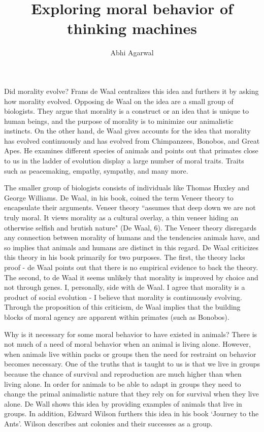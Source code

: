 \documentclass[11pt, oneside]{article}
\title{Exploring moral behavior of thinking machines}
\author{Abhi Agarwal}
\date{}
\begin{document}
\maketitle

\par Did morality evolve? Frans de Waal centralizes this idea and furthers it by asking how morality evolved. Opposing de Waal on the idea are a small group of biologists. They argue that morality is a construct or an idea that is unique to human beings, and the purpose of morality is to minimize our animalistic instincts. On the other hand, de Waal gives accounts for the idea that morality has evolved continuously and has evolved from Chimpanzees, Bonobos, and Great Apes. He examines different species of animals and points out that primates close to us in the ladder of evolution display a large number of moral traits. Traits such as peacemaking, empathy, sympathy, and many more.

\par The smaller group of biologists consists of individuals like Thomas Huxley and George Williams. De Waal, in his book, coined the term Veneer theory to encapsulate their arguments. Veneer theory ``assumes that deep down we are not truly moral. It views morality as a cultural overlay, a thin veneer hiding an otherwise selfish and brutish nature" (De Waal, 6). The Veneer theory disregards any connection between morality of humans and the tendencies animals have, and so implies that animals and humans are distinct in this regard. De Waal criticizes this theory in his book primarily for two purposes. The first, the theory lacks proof - de Waal points out that there is no empirical evidence to back the theory. The second, to de Waal it seems unlikely that morality is improved by choice and not through genes. I, personally, side with de Waal. I agree that morality is a product of social evolution - I believe that morality is continuously evolving. Through the proposition of this criticism, de Waal implies that the building blocks of moral agency are apparent within primates (such as Bonobos).

\par Why is it necessary for some moral behavior to have existed in animals? There is not much of a need of moral behavior when an animal is living alone. However, when animals live within packs or groups then the need for restraint on behavior becomes necessary. One of the truths that is taught to us is that we live in groups because the chance of survival and reproduction are much higher than when living alone. In order for animals to be able to adapt in groups they need to change the primal animalistic nature that they rely on for survival when they live alone. De Wall shows this idea by providing examples of animals that live in groups. In addition, Edward Wilson furthers this idea in his book `Journey to the Ants'. Wilson describes ant colonies and their successes as a group.
\end{document}
